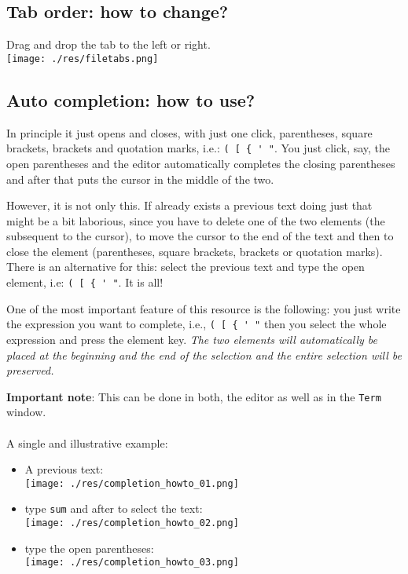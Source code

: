 \subsection{Tab order: how to change?}

Drag and drop the tab to the left or right.\\

\vspace{5mm}
\texttt{[image: ./res/filetabs.png]}\\
\vspace{5mm}

\subsection{Auto completion: how to use?}

In principle it just opens and closes, with just one click, parentheses, square brackets, brackets and quotation marks, i.e.: \verb|( [ { ' "|.
You just click, say, the open parentheses and the editor automatically completes the closing parentheses and after that puts the cursor in the middle
of the two.

However, it is not only this. If already exists a previous text doing just that might be a bit laborious,
since you have to delete one of the two elements (the subsequent to the cursor), to move the cursor
to the end of the text and then to close the element (parentheses, square brackets, brackets or quotation marks).
There is an alternative for this: select the previous text and type the open element, i.e: \verb|( [ { ' "|. It is all!

One of the most important feature of this resource is the following: you just write the expression you want to complete, i.e., \verb|( [ { ' "|
then you select the whole expression and press the element key.
\textit{The two elements will automatically be placed at the beginning and the end of the selection and the entire selection will be preserved.}

\textbf{Important note}: This can be done in both, the editor as well as in the \texttt{Term} window.
\\
\\
A single and illustrative example:
\begin{itemize}
  \item A previous text: \\
    \texttt{[image: ./res/completion\_howto\_01.png]}
  \item type \texttt{sum} and after to select the text: \\
    \texttt{[image: ./res/completion\_howto\_02.png]}
  \item type the open parentheses: \\
    \texttt{[image: ./res/completion\_howto\_03.png]}
\end{itemize}

